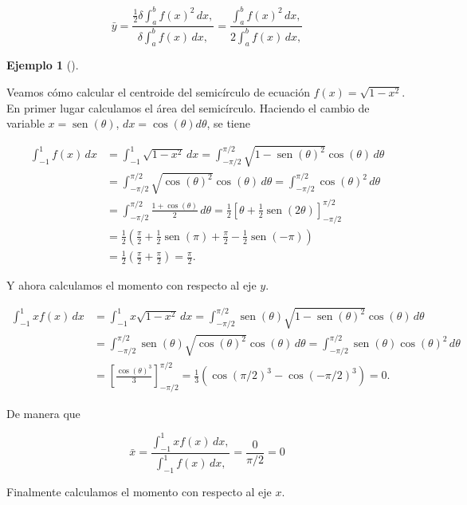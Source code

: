 \documentclass[
  a4paper,
]{scrreport}
\theoremstyle{definition}
\theoremstyle{definition}
\newtheorem{example}{Ejemplo}[chapter]
\theoremstyle{definition}
\theoremstyle{plain}
\theoremstyle{plain}
\theoremstyle{plain}
\theoremstyle{remark}
\begin{document}
\[
\bar y = \frac{\frac{1}{2}\delta \int_a^b f(x)^2\, dx,}{\delta \int_a^b f(x)\, dx,} = \frac{\int_a^b f(x)^2\, dx,}{2\int_a^b f(x)\, dx,}
\]

\begin{example}[]\protect\hypertarget{exm-centroide}{}\label{exm-centroide}

Veamos cómo calcular el centroide del semicírculo de ecuación
\(f(x)=\sqrt{1-x^2}\). En primer lugar calculamos el área del
semicírculo. Haciendo el cambio de variable
\(x=\operatorname{sen}(\theta)\), \(dx = \cos(\theta)d\theta\), se tiene

\begin{align*}
\int_{-1}^1 f(x)\,dx 
&= \int_{-1}^1 \sqrt{1-x^2}\,dx 
= \int_{-\pi/2}^{\pi/2} \sqrt{1-\operatorname{sen}(\theta)^2}\cos(\theta)\,d\theta \\
&= \int_{-\pi/2}^{\pi/2} \sqrt{\cos(\theta)^2}\cos(\theta)\,d\theta
= \int_{-\pi/2}^{\pi/2} \cos(\theta)^2\,d\theta \\
&= \int_{-\pi/2}^{\pi/2} \frac{1+\cos(\theta)}{2}\,d\theta
= \frac{1}{2}\left[\theta + \frac{1}{2}\operatorname{sen}(2\theta) \right]_{-\pi/2}^{\pi/2} \\
&= \frac{1}{2}\left(\frac{\pi}{2}+\frac{1}{2}\operatorname{sen}(\pi)+\frac{\pi}{2}-\frac{1}{2}\operatorname{sen}(-\pi)\right)\\
&= \frac{1}{2}\left(\frac{\pi}{2}+\frac{\pi}{2}\right)
= \frac{\pi}{2}.
\end{align*}

Y ahora calculamos el momento con respecto al eje \(y\).

\begin{align*}
\int_{-1}^1 xf(x)\,dx 
&= \int_{-1}^1 x\sqrt{1-x^2}\,dx 
= \int_{-\pi/2}^{\pi/2} \operatorname{sen}(\theta)\sqrt{1-\operatorname{sen}(\theta)^2}\cos(\theta)\,d\theta \\
&= \int_{-\pi/2}^{\pi/2} \operatorname{sen}(\theta)\sqrt{\cos(\theta)^2}\cos(\theta)\,d\theta
= \int_{-\pi/2}^{\pi/2} \operatorname{sen}(\theta)\cos(\theta)^2\,d\theta \\
&= \left[\frac{\cos(\theta)^3}{3} \right]_{-\pi/2}^{\pi/2} 
= \frac{1}{3}(\cos(\pi/2)^3-\cos(-\pi/2)^3)
= 0.
\end{align*}

De manera que

\[
\bar x = \frac{\int_{-1}^1 x f(x)\, dx,}{\int_{-1}^1 f(x)\, dx,} = \frac{0}{\pi/2} = 0
\]

Finalmente calculamos el momento con respecto al eje \(x\).


\end{example}
\end{document}
